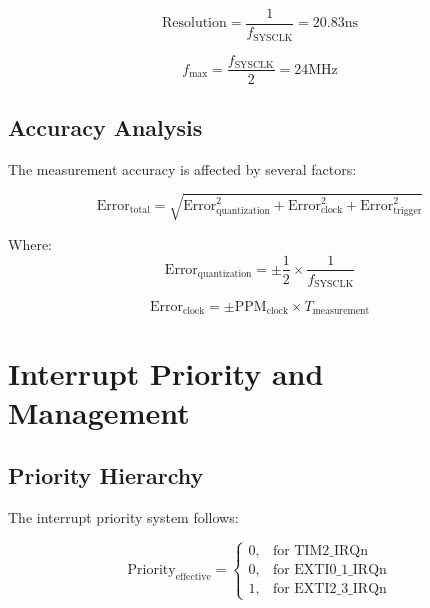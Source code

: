 \documentclass{article}
\begin{document}
\begin{equation}
\text{Resolution} = \frac{1}{f_{\text{SYSCLK}}} = 20.83\text{ns}
\end{equation}

\begin{equation}
f_{\text{max}} = \frac{f_{\text{SYSCLK}}}{2} = 24\text{MHz}
\end{equation}

\subsection{Accuracy Analysis}

The measurement accuracy is affected by several factors:

\begin{equation}
\text{Error}_{\text{total}} = \sqrt{\text{Error}_{\text{quantization}}^2 + \text{Error}_{\text{clock}}^2 + \text{Error}_{\text{trigger}}^2}
\end{equation}

Where:
\begin{equation}
\text{Error}_{\text{quantization}} = \pm\frac{1}{2} \times \frac{1}{f_{\text{SYSCLK}}}
\end{equation}

\begin{equation}
\text{Error}_{\text{clock}} = \pm\text{PPM}_{\text{clock}} \times T_{\text{measurement}}
\end{equation}

\section{Interrupt Priority and Management}
\subsection{Priority Hierarchy}

The interrupt priority system follows:

\begin{equation}
\text{Priority}_{\text{effective}} = \begin{cases}
0, & \text{for TIM2\_IRQn} \\
0, & \text{for EXTI0\_1\_IRQn} \\
1, & \text{for EXTI2\_3\_IRQn}
\end{cases}
\end{equation}
\end{document}
